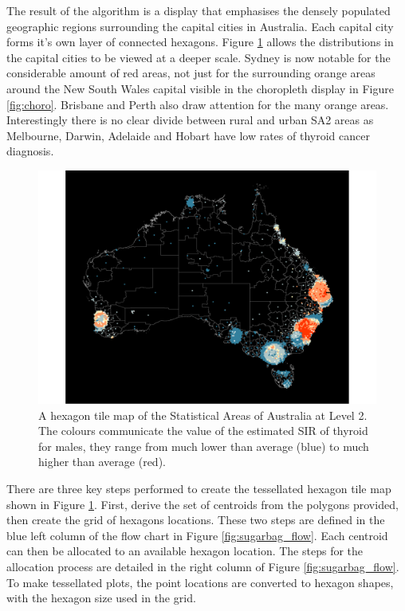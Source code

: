 The result of the algorithm is a display that emphasises the densely
populated geographic regions surrounding the capital cities in
Australia. Each capital city forms it's own layer of connected hexagons.
Figure \ref{fig:hexmap} allows the distributions in the capital cities
to be viewed at a deeper scale. Sydney is now notable for the
considerable amount of red areas, not just for the surrounding orange
areas around the New South Wales capital visible in the choropleth
display in Figure \ref{fig:choro}. Brisbane and Perth also draw
attention for the many orange areas. Interestingly there is no clear
divide between rural and urban SA2 areas as Melbourne, Darwin, Adelaide
and Hobart have low rates of thyroid cancer diagnosis.

\begin{Schunk}
\begin{figure}
\includegraphics[width=0.95\linewidth]{kobakian-cook_files/figure-latex/hexmap-1} \caption[A hexagon tile map of the Statistical Areas of Australia at Level 2]{A hexagon tile map of the Statistical Areas of Australia at Level 2. The colours communicate the value of the estimated SIR of thyroid for males, they range from much lower than average (blue) to much higher than average (red).}\label{fig:hexmap}
\end{figure}
\end{Schunk}

There are three key steps performed to create the tessellated hexagon
tile map shown in Figure \ref{fig:hexmap}. First, derive the set of
centroids from the polygons provided, then create the grid of hexagons
locations. These two steps are defined in the blue left column of the
flow chart in Figure \ref{fig:sugarbag_flow}. Each centroid can then be
allocated to an available hexagon location. The steps for the allocation
process are detailed in the right column of Figure
\ref{fig:sugarbag_flow}. To make tessellated plots, the point locations
are converted to hexagon shapes, with the hexagon size used in the grid.

